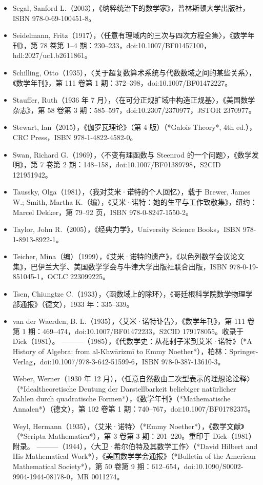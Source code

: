 \begin{itemize}
\item Segal, Sanford L.（2003），《纳粹统治下的数学家》，普林斯顿大学出版社，ISBN 978-0-69-100451-8。
\item Seidelmann, Fritz（1917），〈任意有理域内的三次与四次方程全集〉，《数学年刊》，第 78 卷第 1–4 期：230–233，doi:10.1007/BF01457100，hdl:2027/uc1.b2611861。
\item Schilling, Otto（1935），〈关于超复数算术系统与代数数域之间的某些关系〉，《数学年刊》，第 111 卷第 1 期：372–398，doi:10.1007/BF01472227。
\item Stauffer, Ruth（1936 年 7 月），〈在可分正规扩域中构造正规基〉，《美国数学杂志》，第 58 卷第 3 期：585–597，doi:10.2307/2370977，JSTOR 2370977。
\item Stewart, Ian（2015），《伽罗瓦理论》（第 4 版）（*Galois Theory*, 4th ed.），CRC Press，ISBN 978-1-4822-4582-0。
\item Swan, Richard G.（1969），〈不变有理函数与 Steenrod 的一个问题〉，《数学发明》，第 7 卷第 2 期：148–158，doi:10.1007/BF01389798，S2CID 121951942。
\item Taussky, Olga（1981），〈我对艾米·诺特的个人回忆〉，载于 Brewer, James W.; Smith, Martha K.（编），《艾米·诺特：她的生平与工作致敬集》，纽约：Marcel Dekker，第 79–92 页，ISBN 978-0-8247-1550-2。
\item Taylor, John R.（2005），《经典力学》，University Science Books，ISBN 978-1-8913-8922-1。
\item Teicher, Mina（编）（1999），《艾米·诺特的遗产》，《以色列数学会议论文集》，巴伊兰大学、美国数学学会与牛津大学出版社联合出版，ISBN 978-0-19-851045-1，OCLC 223099225。
\item Tsen, Chiungtze C.（1933），〈函数域上的除环〉，《哥廷根科学院数学物理学部通报》（德文），1933 年：335–339。
\item van der Waerden, B. L.（1935），〈艾米·诺特讣告〉，《数学年刊》，第 111 卷第 1 期：469–474，doi:10.1007/BF01472233，S2CID 179178055。收录于 Dick（1981）。
———（1985），《代数学史：从花剌子米到艾米·诺特》（*A History of Algebra: from al-Khwārizmī to Emmy Noether*），柏林：Springer-Verlag，doi:10.1007/978-3-642-51599-6，ISBN 978-0-387-13610-3。

Weber, Werner（1930 年 12 月），〈任意自然数由二次型表示的理想论诠释〉（*Idealtheoretische Deutung der Darstellbarkeit beliebiger natürlicher Zahlen durch quadratische Formen*），《数学年刊》（*Mathematische Annalen*）（德文），第 102 卷第 1 期：740–767，doi:10.1007/BF01782375。

Weyl, Hermann（1935），〈艾米·诺特〉（*Emmy Noether*），《数学文献》（*Scripta Mathematica*），第 3 卷第 3 期：201–220。重印于 Dick（1981）附录。
———（1944），〈大卫·希尔伯特及其数学工作〉（*David Hilbert and His Mathematical Work*），《美国数学学会通报》（*Bulletin of the American Mathematical Society*），第 50 卷第 9 期：612–654，doi:10.1090/S0002-9904-1944-08178-0，MR 0011274。


\end{itemize}
